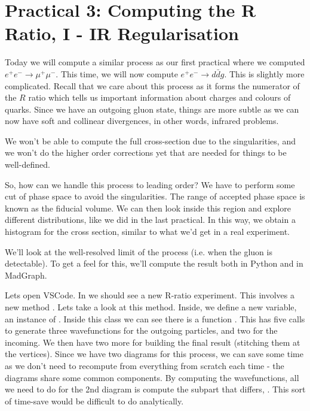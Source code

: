 \section*{Practical 3: Computing the R Ratio, I - IR Regularisation }

Today we will compute a similar process as our first practical where we computed $e^+ e^-\to \mu^+\mu^-$. This time, we will now compute $e^+e^-\to d\bar{d}g$. This is slightly more complicated. Recall that we care about this process as it forms the numerator of the $R$ ratio which tells us important information about charges and colours of quarks. Since we have an outgoing gluon state, things are more subtle as we can now have soft and collinear divergences, in other words, infrared problems. 

We won't be able to compute the full cross-section due to the singularities, and we won't do the higher order corrections yet that are needed for things to be well-defined.

So, how can we handle this process to leading order? We have to perform some cut of phase space to avoid the singularities. The range of accepted phase space is known as the fiducial volume. We can then look inside this region and explore different distributions, like we did in the last practical. In this way, we obtain a histogram for the cross section, similar to what we'd get in a real experiment.


We'll look at the well-resolved limit of the process (i.e. when the gluon is detectable). To get a feel for this, we'll compute the result both in Python and in MadGraph.

Lets open VSCode. In  we should see a new R-ratio experiment. This involves a new method . Lets take a look at this method. Inside, we define a new  variable, an instance of . Inside this class we can see there is a function .
This has five calls to generate three wavefunctions for the outgoing particles, and two for the incoming. We then have two more for building the final result (stitching them at the vertices). Since we have two diagrams for this process, we can save some time as we don't need to recompute from everything from scratch each time - the diagrams share some common components. By computing the wavefunctions, all we need to do for the 2nd diagram is compute the subpart that differs, . This sort of time-save would be difficult to do analytically.


